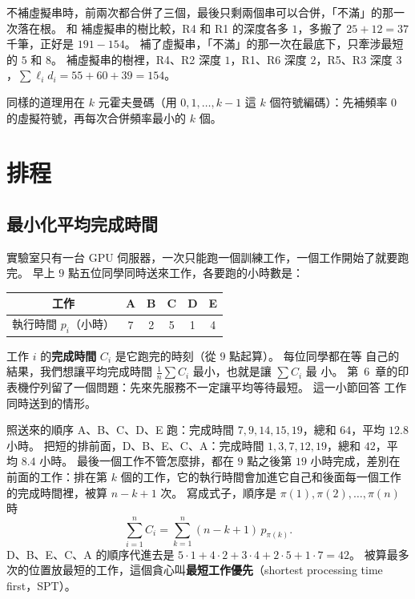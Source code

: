 不補虛擬串時，前兩次都合併了三個，最後只剩兩個串可以合併，「不滿」的那一次落在根。 和
補虛擬串的樹比較，R4 和 R1 的深度各多 $1$，多搬了 $25 + 12 = 37$ 千筆，正好是
$191 - 154$。 補了虛擬串，「不滿」的那一次在最底下，只牽涉最短的 $5$ 和 $8$。 補虛擬串的樹裡，R4、R2 深度 $1$，R1、R6 深度 $2$，R5、R3
深度 $3$，$\sum \ell_i d_i = 55 + 60 + 39 = 154$。

同樣的道理用在 $k$ 元霍夫曼碼（用 $0, 1, \ldots, k - 1$ 這 $k$ 個符號編碼）：先補頻率
$0$ 的虛擬符號，再每次合併頻率最小的 $k$ 個。

\section{排程}
\label{sec:gr-sched}

\subsection{最小化平均完成時間}
\label{sec:gr-spt}

實驗室只有一台 GPU 伺服器，一次只能跑一個訓練工作，一個工作開始了就要跑完。 早上
$9$ 點五位同學同時送來工作，各要跑的小時數是：

\begin{center}
\begin{tabular}{c*{5}{c}}
\toprule
工作 & A & B & C & D & E \\
\midrule
執行時間 $p_i$（小時） & 7 & 2 & 5 & 1 & 4 \\
\bottomrule
\end{tabular}
\end{center}

工作 $i$ 的\textbf{完成時間} $C_i$ 是它跑完的時刻（從 $9$ 點起算）。 每位同學都在等
自己的結果，我們想讓平均完成時間 $\frac{1}{n}\sum C_i$ 最小，也就是讓 $\sum C_i$ 最
小。 第~6~章的印表機佇列留了一個問題：先來先服務不一定讓平均等待最短。 這一小節回答
工作同時送到的情形。

照送來的順序 A、B、C、D、E 跑：完成時間 $7, 9, 14, 15, 19$，總和 $64$，平均
$12.8$ 小時。 把短的排前面，D、B、E、C、A：完成時間 $1, 3, 7, 12, 19$，總和 $42$，平
均 $8.4$ 小時。 最後一個工作不管怎麼排，都在 $9$ 點之後第 $19$ 小時完成，差別在前面的工作：排在第 $k$
個的工作，它的執行時間會加進它自己和後面每一個工作的完成時間裡，被算 $n - k + 1$ 次。
寫成式子，順序是 $\pi(1), \pi(2), \ldots, \pi(n)$ 時
\[
\sum_{i=1}^{n} C_i = \sum_{k=1}^{n} (n - k + 1)\, p_{\pi(k)}.
\]
D、B、E、C、A 的順序代進去是 $5 \cdot 1 + 4 \cdot 2 + 3 \cdot 4 + 2 \cdot 5 + 1 \cdot 7 =
42$。 被算最多次的位置放最短的工作，這個貪心叫\textbf{最短工作優先}（shortest
processing time first，SPT）。

